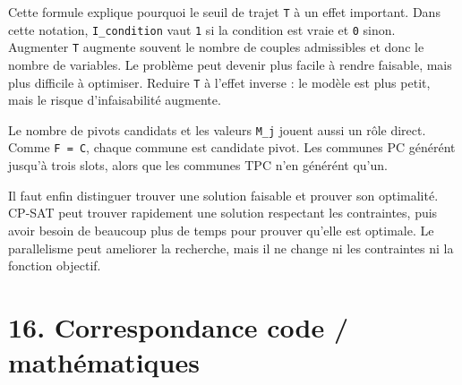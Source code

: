 \documentclass[11pt,a4paper]{article}
\begin{document}
Cette formule explique pourquoi le seuil de trajet \texttt{T} à un effet important. Dans cette notation, \texttt{I\_condition} vaut \texttt{1} si la condition est vraie et \texttt{0} sinon. Augmenter \texttt{T} augmente souvent le nombre de couples admissibles et donc le nombre de variables. Le problème peut devenir plus facile à rendre faisable, mais plus difficile à optimiser. Reduire \texttt{T} à l'effet inverse : le modèle est plus petit, mais le risque d'infaisabilité augmente.

Le nombre de pivots candidats et les valeurs \texttt{M\_j} jouent aussi un rôle direct. Comme \texttt{F = C}, chaque commune est candidate pivot. Les communes PC générént jusqu'à trois slots, alors que les communes TPC n'en générént qu'un.

Il faut enfin distinguer trouver une solution faisable et prouver son optimalité. CP-SAT peut trouver rapidement une solution respectant les contraintes, puis avoir besoin de beaucoup plus de temps pour prouver qu'elle est optimale. Le parallelisme peut ameliorer la recherche, mais il ne change ni les contraintes ni la fonction objectif.

\section{16. Correspondance code / mathématiques}
\end{document}
